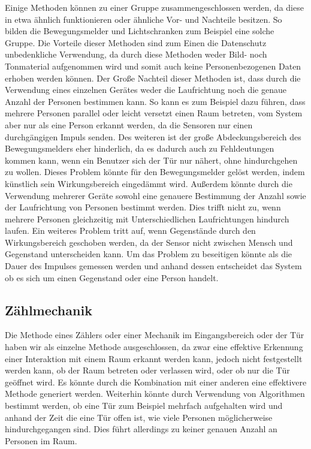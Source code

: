 Einige Methoden können zu einer Gruppe zusammengeschlossen werden, da diese
in etwa ähnlich funktionieren oder ähnliche Vor- und Nachteile besitzen. So
bilden die Bewegungsmelder und Lichtschranken zum Beispiel eine solche Gruppe.
Die Vorteile dieser Methoden sind zum Einen die Datenschutz unbedenkliche
Verwendung, da durch diese Methoden weder Bild- noch Tonmaterial aufgenommen
wird und somit auch keine Personenbezogenen Daten erhoben werden können.
Der Große Nachteil dieser Methoden ist, dass durch die Verwendung eines
einzelnen Gerätes weder die Laufrichtung noch die genaue Anzahl der Personen
bestimmen kann. So kann es zum Beispiel dazu führen, dass mehrere Personen
parallel oder leicht versetzt einen Raum betreten, vom System aber nur als
eine Person erkannt werden, da die Sensoren nur einen durchgängigen Impuls
senden. Des weiteren ist der große Abdeckungsbereich des Bewegungsmelders
eher hinderlich, da es dadurch auch zu Fehldeutungen kommen kann, wenn
ein Benutzer sich der Tür nur nähert, ohne hindurchgehen zu wollen.
Dieses Problem könnte für den Bewegungsmelder gelöst werden, indem künstlich
sein Wirkungsbereich eingedämmt wird. Außerdem könnte durch die Verwendung
mehrerer Geräte sowohl eine genauere Bestimmung der Anzahl sowie der
Laufrichtung von Personen bestimmt werden. Dies trifft nicht zu, wenn
mehrere Personen gleichzeitig mit Unterschiedlichen Laufrichtungen hindurch
laufen. Ein weiteres Problem tritt auf, wenn Gegenstände durch den
Wirkungsbereich geschoben werden, da der Sensor nicht zwischen Mensch und
Gegenstand unterscheiden kann. Um das Problem zu beseitigen könnte als
die Dauer des Impulses gemessen werden und anhand dessen entscheidet
das System ob es sich um einen Gegenstand oder eine Person handelt.

\subsection{Zählmechanik}
\label{anhang:Zählmechanik}

Die Methode eines Zählers oder einer Mechanik im Eingangsbereich oder der
Tür haben wir als einzelne Methode ausgeschlossen, da zwar eine effektive
Erkennung einer Interaktion mit einem Raum erkannt werden kann, jedoch
nicht festgestellt werden kann, ob der Raum betreten oder verlassen wird,
oder ob nur die Tür geöffnet wird. Es könnte durch die Kombination mit
einer anderen eine effektivere Methode generiert werden. Weiterhin könnte
durch Verwendung von Algorithmen bestimmt werden, ob eine Tür zum Beispiel
mehrfach aufgehalten wird und anhand der Zeit die eine Tür offen ist, wie
viele Personen möglicherweise hindurchgegangen sind. Dies führt allerdings
zu keiner genauen Anzahl an Personen im Raum.


